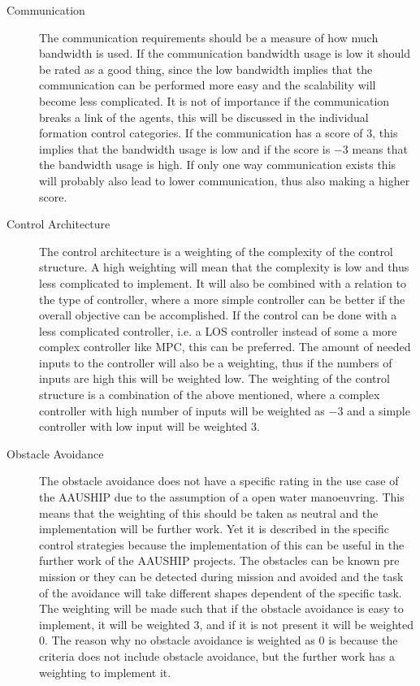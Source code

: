 \begin{description}
\item[Communication] The communication requirements should be a measure of how much bandwidth is used. If the communication bandwidth usage is low it should be rated as a good thing, since the low bandwidth implies that the communication can be performed more easy and the scalability will become less complicated. It is not of importance if the communication breaks a link of the agents, this will be discussed in the individual formation control categories. If the communication has a score of $3$, this implies that the bandwidth usage is low and if the score is $-3$ means that the bandwidth usage is high. If only one way communication exists this will probably also lead to lower communication, thus also making a higher score.

\item[Control Architecture] The control architecture is a weighting of the complexity of the control structure. A high weighting will mean that the complexity is low and thus less complicated to implement. It will also be combined with a relation to the type of controller, where a more simple controller can be better if the overall objective can be accomplished. If the control can be done with a less complicated controller, i.e. a \ac{LOS} controller instead of some a more complex controller like \ac{MPC}, this can be preferred. The amount of needed inputs to the controller will also be a weighting, thus if the numbers of inputs are high this will be weighted low. The weighting of the control structure is a combination of the above mentioned, where a complex controller with high number of inputs will be weighted as $-3$ and a simple controller with low input will be weighted $3$.

\item[Obstacle Avoidance] The obstacle avoidance does not have a specific rating in the use case of the AAUSHIP due to the assumption of a open water manoeuvring. This means that the weighting of this should be taken as neutral and the implementation will be further work. Yet it is described in the specific control strategies because the implementation of this can be useful in the further work of the AAUSHIP projects. The obstacles can be known pre mission or they can be detected during mission and avoided and the task of the avoidance will take different shapes dependent of the specific task. The weighting will be made such that if the obstacle avoidance is easy to implement, it will be weighted $3$, and if it is not present it will be weighted $0$. The reason why no obstacle avoidance is weighted as $0$ is because the criteria does not include obstacle avoidance, but the further work has a weighting to implement it.


\end{description}
